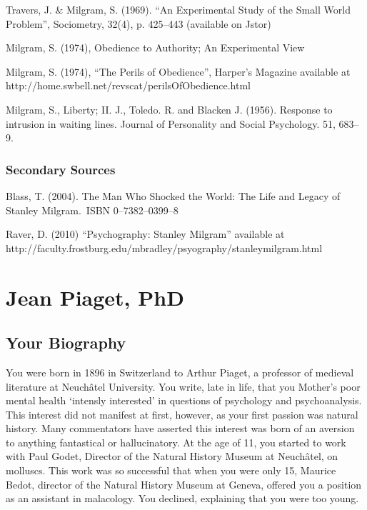 Travers, J. \& Milgram, S. (1969). ``An Experimental Study of the Small World Problem'', Sociometry, 32(4), p. 425--443 (available on Jstor)

Milgram, S. (1974), Obedience to Authority; An Experimental View

Milgram, S. (1974), ``The Perils of Obedience'', Harper's Magazine available at http:\slash \slash home.swbell.net\slash revscat\slash perilsOfObedience.html

Milgram, S., Liberty; II. J., Toledo. R. and Blacken J. (1956). Response to intrusion in waiting lines. Journal of Personality and Social Psychology. 51, 683--9.

\subsection{Secondary Sources}
\label{secondarysources}

Blass, T. (2004). The Man Who Shocked the World: The Life and Legacy of Stanley Milgram. ISBN 0--7382--0399--8

Raver, D. (2010) ``Psychography: Stanley Milgram'' available at http:\slash \slash faculty.frostburg.edu\slash mbradley\slash psyography\slash stanleymilgram.html

\chapter{Jean Piaget, PhD}
\label{jeanpiagetphd}

\section{Your Biography}
\label{yourbiography}

You were born in 1896 in Switzerland to Arthur Piaget, a professor of medieval literature at Neuchâtel University. You write, late in life, that you Mother's poor mental health `intensly interested' in questions of psychology and psychoanalysis. This interest did not manifest at first, however, as your first passion was natural history. Many commentators have asserted this interest was born of an aversion to anything fantastical or hallucinatory. At the age of 11, you started to work with Paul Godet, Director of the Natural History Museum at Neuchâtel, on molluscs. This work was so successful that when you were only 15, Maurice Bedot, director of the Natural History Museum at Geneva, offered you a position as an assistant in malacology. You declined, explaining that you were too young.

